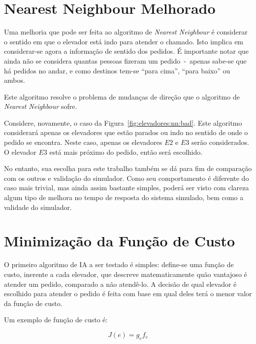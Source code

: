 \section{\label{sec:ai:nnm}Nearest Neighbour Melhorado}

Uma melhoria que pode ser feita ao algoritmo de \textit{Nearest Neighbour}
é considerar o sentido em que o elevador está indo para atender o chamado. Isto
implica em considerar-se agora a informação de sentido dos pedidos. É importante
notar que ainda não se considera quantas pessoas fizeram um pedido~-~apenas
sabe-se que há pedidos no andar, e como destinos tem-se ``para cima'', ``para
baixo'' ou ambos.

Este algoritmo resolve o problema de mudanças de direção que o algoritmo de
\textit{Nearest Neighbour} sofre.

Considere, novamente, o caso da Figura~\ref{fig:elevadores:nn:bad}. Este
algoritmo considerará apenas os elevadores que estão parados ou indo no sentido
de onde o pedido se encontra. Neste caso, apenas os elevadores $E2$ e $E3$ serão
considerados. O elevador $E3$ está mais próximo do pedido, então será escolhido.

No entanto, sua escolha para este trabalho também se dá para fim de comparação
com os outros e validação do simulador. Como seu comportamento é diferente do
caso mais trivial, mas ainda assim bastante simples, poderá ser visto com clareza
algum tipo de melhora no tempo de resposta do sistema simulado, bem como a validade do simulador.

\section{\label{sec:ai:minimize-cost-function}Minimização da Função de Custo}

O primeiro algoritmo de IA a ser testado é simples: define-se uma
função de custo, inerente a cada elevador, que descreve matematicamente quão
vantajoso é atender um pedido, comparado a não atendê-lo. A decisão de qual
elevador é escolhido para atender o pedido é feita com base em qual deles
terá o menor valor da função de custo.

Um exemplo de função de custo é:

\[
  J(e) = g_{e}f_{e}
\]

